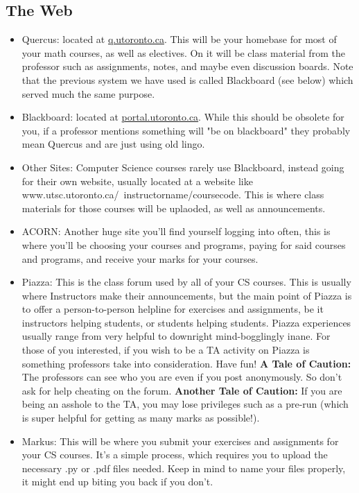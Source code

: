 \documentclass[11pt]{article}
\begin{document}
\subsection{The Web}
\begin{itemize}
\item Quercus: located at \url{q.utoronto.ca}. This will be your
    homebase for most of your math courses, as well as electives. On it will
    be class material from the professor such as assignments, notes, and
    maybe even discussion boards. Note that the previous system we have used
    is called Blackboard (see below) which served much the same purpose.
\item Blackboard: located at \url{portal.utoronto.ca}. While this should
    be obsolete for you, if a professor mentions something will "be on
    blackboard" they probably mean Quercus and are just using old lingo.
\item Other Sites: Computer Science courses rarely use Blackboard,
    instead going for their own website, usually located at a website like
    www.utsc.utoronto.ca/~instructorname/coursecode. This is where class
    materials for those courses will be uplaoded, as well as announcements.
\item ACORN: Another huge site you'll find yourself logging into often,
    this is where you'll be choosing your courses and programs, paying for
    said courses and programs, and receive your marks for your courses.
\item Piazza: This is the class forum used by all of your CS courses.
    This is usually where Instructors make their announcements, but the 
    main point of Piazza is to offer a person-to-person helpline for 
    exercises and assignments, be it instructors helping students, or 
    students helping students. Piazza experiences usually range from very 
    helpful to downright mind-bogglingly inane. For those of you interested, 
    if you wish to be a TA activity on Piazza is something professors take 
    into consideration. Have fun! \textbf{A Tale of Caution:} The professors
    can see who you are even if you post anonymously. So don't ask for help
    cheating on the forum. \textbf{Another Tale of Caution:} If you are
    being an asshole to the TA, you may lose privileges such as a pre-run
    (which is super helpful for getting as many marks as possible!).
\item Markus: This will be where you submit your exercises and
    assignments for your CS courses. It's a simple process, which requires
    you to upload the necessary .py or .pdf files needed. Keep in mind to
    name your files properly, it might end up biting you back if you don't.
\end{itemize}
\end{document}

